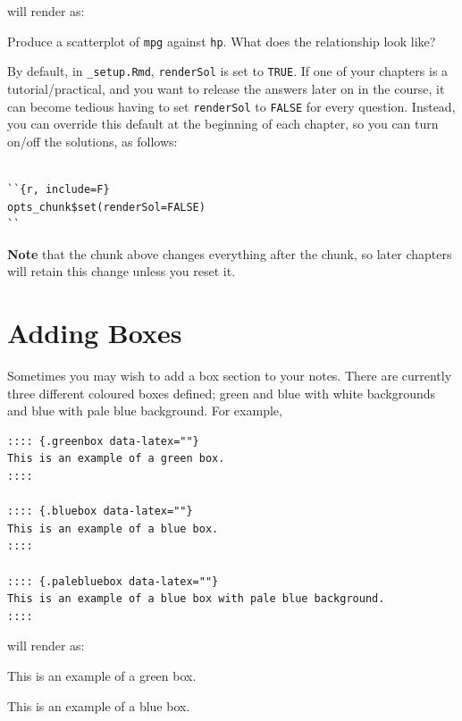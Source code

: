 \documentclass[
  oneside]{krantz}
\newcommand{\bblockT}[2][Task]{\begin{tcolorbox}[title = #1 #2, parbox = false]}
\newcommand{\eblockT}{\end{tcolorbox}}
\theoremstyle{definition}
\theoremstyle{definition}
\theoremstyle{definition}
\theoremstyle{remark}
\begin{document}
will render as:

\hypertarget{tsk7}{}\bblockT[Task (solution hidden)]{\phantomsection\label{sol7}7}

Produce a scatterplot of \texttt{mpg} against \texttt{hp}. What does the relationship look like?
\eblockT

By default, in \texttt{\_setup.Rmd}, \texttt{renderSol} is set to \texttt{TRUE}. If one of your chapters is a tutorial/practical, and you want to release the answers later on in the course,
it can become tedious having to set \texttt{renderSol} to \texttt{FALSE} for every question.
Instead, you can override this default at the beginning of each chapter, so you can turn on/off the solutions, as follows:

\begin{verbatim}

``{r, include=F}
opts_chunk$set(renderSol=FALSE)
``
\end{verbatim}

\textbf{Note} that the chunk above changes everything after the chunk, so later chapters will retain this change unless you reset it.

\hypertarget{adding-boxes}{%
\section{Adding Boxes}\label{adding-boxes}}

Sometimes you may wish to add a box section to your notes. There are currently three different coloured boxes defined; green and blue with white backgrounds and blue with pale blue background. For example,

\begin{verbatim}
:::: {.greenbox data-latex=""}
This is an example of a green box.
::::

:::: {.bluebox data-latex=""}
This is an example of a blue box.
::::

:::: {.palebluebox data-latex=""}
This is an example of a blue box with pale blue background.
::::
\end{verbatim}

will render as:

\begin{greenbox}

This is an example of a green box.

\end{greenbox}

\begin{bluebox}

This is an example of a blue box.

\end{bluebox}
\end{document}
